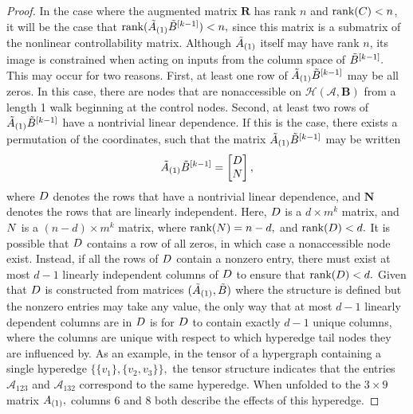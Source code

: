 \documentclass[10pt,a4paper]{amsart}
\newcommand{\At}{\mathscr{A}}
\newcommand{\Bv}{\mathbf{B}}
\newcommand{\Hs}{\mathcal{H}}
\newcommand{\Nv}{\mathbf{N}}
\newcommand{\Rv}{\mathbf{R}}
\newcommand{\rank}{\text{rank}}
\begin{document}
\begin{proof}
    In the case where the augmented matrix $\Rv$ has rank $n$ and $\rank(\textbf C)<n$, it will be the case that $\rank(\tilde{\textbf A}_{(1)}\tilde{\textbf B}^{[k-1]})<n,$ since this matrix is a submatrix of the nonlinear controllability matrix.
    Although $\tilde{\textbf A}_{(1)}$ itself may have rank $n$, its image is constrained when acting on inputs from the column space of $\tilde{\textbf B}^{[k-1]}.$ This may occur for two reasons. First, at least one row of $\tilde{\textbf A}_{(1)}\tilde{\textbf B}^{[k-1]}$ may be all zeros. In this case, there are nodes that are nonaccessible on $\Hs(\At,\Bv)$ from a length 1 walk beginning at the control nodes. Second, at least two rows of $\tilde{\textbf A}_{(1)}\tilde{\textbf B}^{[k-1]}$ have a nontrivial linear dependence. If this is the case, there exists a permutation of the coordinates, such that the matrix $\tilde{\textbf A}_{(1)}\tilde{\textbf B}^{[k-1]}$ may be written
        \begin{equation*}
            \tilde{\textbf A}_{(1)}\tilde{\textbf B}^{[k-1]}=\begin{bmatrix}
                \textbf D\\
                \textbf N
            \end{bmatrix},
        \end{equation*}
        where $\textbf D$ denotes the rows that have a nontrivial linear dependence, and $\Nv$ denotes the rows that are linearly independent. Here, $\textbf D$ is a $d\times m^{k}$ matrix, and $\textbf N$ is a $(n-d)\times m^{k}$ matrix, where $\rank(\textbf N)=n-d,$ and $\rank(\textbf D)<d.$ It is possible that $\textbf D$ contains a row of all zeros, in which case a nonaccessible node exist.
        Instead, if all the rows of $\textbf D$ contain a nonzero entry, there must exist at most $d-1$ linearly independent columns of $\textbf D$ to ensure that $\rank(\textbf D)<d.$
        Given that $\textbf D$ is constructed from matrices $(\tilde{\textbf A}_{(1)}, \tilde{\textbf B})$ where the structure is defined but the nonzero entries may take any value, the only way that at most $d-1$ linearly dependent columns are in $\textbf D$ is for $\textbf D$ to contain exactly $d-1$ unique columns, where the columns are unique with respect to which hyperedge tail nodes they are influenced by. As an example, in the tensor of a hypergraph containing a single hyperedge $\{\{v_1\},\{v_2,v_3\}\},$ the tensor structure indicates that the entries $\mathscr A_{123}$ and $\At_{132}$ correspond to the same hyperedge. When unfolded to the $3\times 9$ matrix $\textbf A_{(1)},$ columns 6 and 8 both describe the effects of this hyperedge. 


\end{proof}
\end{document}
